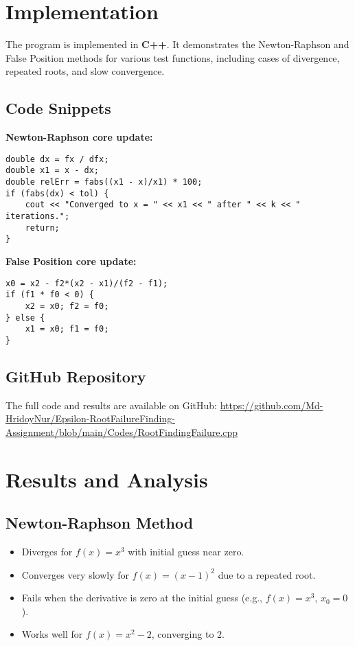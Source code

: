 \documentclass[12pt,a4paper]{article}
\begin{document}
\section{Implementation}

The program is implemented in \textbf{C++}. It demonstrates the Newton-Raphson and False Position methods for various test functions, including cases of divergence, repeated roots, and slow convergence.

\subsection{Code Snippets}

\textbf{Newton-Raphson core update:}
\begin{verbatim}
double dx = fx / dfx;
double x1 = x - dx;
double relErr = fabs((x1 - x)/x1) * 100;
if (fabs(dx) < tol) {
    cout << "Converged to x = " << x1 << " after " << k << " iterations.";
    return;
}
\end{verbatim}

\textbf{False Position core update:}
\begin{verbatim}
x0 = x2 - f2*(x2 - x1)/(f2 - f1);
if (f1 * f0 < 0) { 
    x2 = x0; f2 = f0; 
} else { 
    x1 = x0; f1 = f0; 
}
\end{verbatim}

\subsection{GitHub Repository}

The full code and results are available on GitHub: \url{https://github.com/Md-HridoyNur/Epsilon-RootFailureFinding-Assignment/blob/main/Codes/RootFindingFailure.cpp}


\section{Results and Analysis}

\subsection{Newton-Raphson Method}
\begin{itemize}
    \item Diverges for $f(x) = x^3$ with initial guess near zero.
    \item Converges very slowly for $f(x) = (x-1)^2$ due to a repeated root.
    \item Fails when the derivative is zero at the initial guess (e.g., $f(x) = x^3$, $x_0 = 0$).
    \item Works well for $f(x) = x^2 - 2$, converging to $2$.
\end{itemize}
\end{document}
